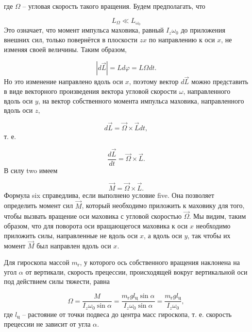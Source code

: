 \documentclass[12pt, a4paper]{article}
\begin{document}
где $ \Omega $ -- угловая скорость такого вращения. Будем предполагать, что

\begin{equation}
L_\Omega \ll L_{\omega_0}
\label{five}
\end{equation}
Это означает, что момент импульса маховика, равный $ I_z\omega_0 $ до приложения внешних сил, только повернётся в плоскости $ zx $ по направлению к оси $ x $, не изменяя своей величины. Таким образом, 

\begin{equation}
\left|d\vec{L}\right| = Ld\varphi = L\Omega dt.
\end{equation}
Но это изменение направлено вдоль оси $ x $, поэтому вектор $ d\vec{L} $ можно представить в виде векторного произведения вектора угловой скорости $ \omega $, направленного вдоль оси $ y $, на вектор собственного момента импульса маховика, направленного вдоль оси $ z $,

\begin{equation}
d\vec{L}=\vec{\Omega} \times \vec{L} dt,
\end{equation}
т. е.

\begin{equation}
\frac{d\vec{L}}{dt} = \vec{\Omega} \times \vec{L}.
\end{equation}
В силу {two} имеем

\begin{equation}
\vec{M} = \vec{\Omega} \times \vec{L}.
\label{six}
\end{equation}
Формула {six} справедлива, если выполнено условие {five}. Она позволяет определить момент сил $ \vec{M} $, который необходимо приложить к маховику для того, чтобы вызвать вращение оси маховика с угловой скоростью $ \vec{\Omega} $. Мы видим, таким образом, что для поворота оси вращающегося маховика к оси $ x $ необходимо приложить силы, направленные не вдоль оси $ x $, а вдоль оси $ y $, так чтобы их момент $ \vec{M} $ был направлен вдоль оси $ x $.

Для гироскопа массой $ m_\text{г} $, у которого ось собственного вращения наклонена на угол $ \alpha $ от вертикали, скорость прецессии, происходящей вокруг вертикальной оси под действием силы тяжести, равна

\begin{equation}
\Omega = \frac{M}{I_z\omega_0\sin \alpha} = \frac{m_\text{г}gl_\text{ц}\sin\alpha}{I_z\omega_0\sin\alpha} = \frac{m_\text{г}gl_\text{ц}}{I_z\omega_0},
\end{equation}
где $ l_\text{ц} $ -- растояние от точки подвеса до центра масс гироскопа, т. е. скорость прецессии не зависит от угла $ \alpha $.
\end{document}
